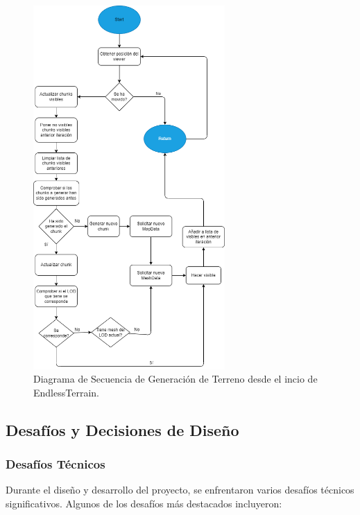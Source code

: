 \begin{figure}[H]
    \centering
    \includegraphics[width=0.65\textwidth]{img/FlowDiagramEndlessTerrain.png}
    \caption{Diagrama de Secuencia de Generación de Terreno desde el incio de EndlessTerrain.}
\end{figure}

\subsection{Desafíos y Decisiones de Diseño}

\subsubsection{Desafíos Técnicos}
Durante el diseño y desarrollo del proyecto, se enfrentaron varios desafíos técnicos significativos. Algunos de los desafíos más destacados incluyeron:


